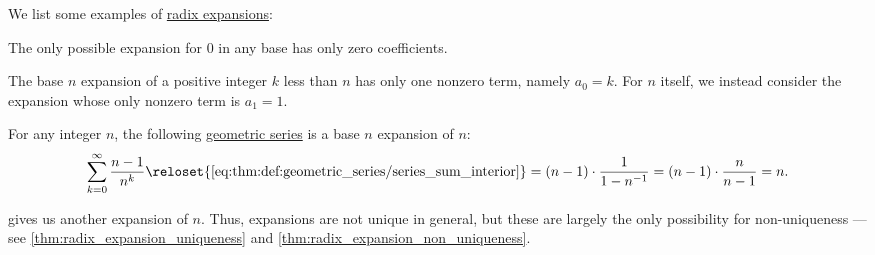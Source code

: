 \begin{example}\label{ex:def:real_number_radix_expansion}
  We list some examples of \hyperref[def:real_number_radix_expansion]{radix expansions}:
  \begin{thmenum}
     The only possible expansion for \( 0 \) in any base has only zero coefficients.

     The base \( n \) expansion of a positive integer \( k \) less than \( n \) has only one nonzero term, namely \( a_0 = k \). For \( n \) itself, we instead consider the expansion whose only nonzero term is \( a_1 = 1 \).

     For any integer \( n \), the following \hyperref[def:geometric_series]{geometric series} is a base \( n \) expansion of \( n \):
    \begin{equation}\label{eq:ex:def:real_number_radix_expansion/geometric}
      \sum_{k=0}^\infty \frac {n - 1} {n^k}
      \reloset{\eqref{eq:thm:def:geometric_series/series_sum_interior}} =
      (n - 1) \cdot \frac 1 {1 - n^{-1}}
      =
      (n - 1) \cdot \frac n {n - 1}
      =
      n.
    \end{equation}

     gives us another expansion of \( n \). Thus, expansions are not unique in general, but these are largely the only possibility for non-uniqueness --- see \cref{thm:radix_expansion_uniqueness} and \cref{thm:radix_expansion_non_uniqueness}.
  \end{thmenum}
\end{example}


